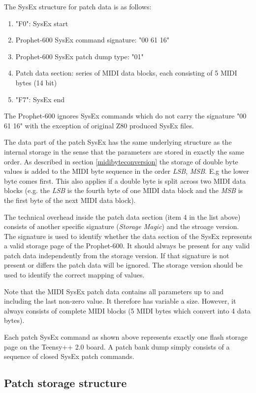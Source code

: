 The SysEx structure for patch data is as follows:

\begin{enumerate}
  \item "F0": SysEx start
  \item Prophet-600 SysEx command signature: "00 61 16"
  \item Prophet-600 SysEx patch dump type: "01"
  \item Patch data section: series of MIDI data blocks, each consisting of 5 MIDI bytes (14 bit) 
  \item "F7": SysEx end
\end{enumerate}

The Prophet-600 ignores SysEx commands which do not carry the signature "00 61 16" with the exception of original Z80 produced SysEx files.

The data part of the patch SysEx has the same underlying structure as the internal storage in the sense that the parameters are stored in exactly the same order. As described in section \ref{midibyteconversion} the storage of double  byte values is added to the MIDI byte sequence in the order \textit{LSB}, \textit{MSB}. E.g the lower byte comes first. This also applies if a double byte is split across two MIDI data blocks (e.g. the \textit{LSB} is the fourth byte of one MIDI data block and the \textit{MSB} is the first byte of the next MIDI data block). 

The technical overhead inside the patch data section (item 4 in the list above) consists of another specific signature (\textit{Storage Magic}) and the stroage version. The signature is used to identify whether the data section of the SysEx represents a valid storage page of the Prophet-600. It should  always be present for any valid patch data independently from the storage version. If that signature is not present or differs the patch data will be ignored. The storage version should be used to identify the correct mapping of values.  

Note that the MIDI SysEx patch data contains all parameters up to and including the last non-zero value. It therefore has variable a size. However, it always consists of complete MIDI blocks (5 MIDI bytes which convert into 4 data bytes).

Each patch SysEx command as shown above represents exactly one flash storage page on the Teensy++ 2.0 board. A patch bank dump simply consists of a sequence of closed SysEx patch commands.

\subsection{Patch storage structure}\label{patchstore}

